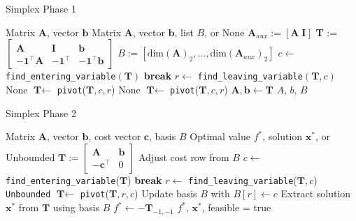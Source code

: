 \documentclass[conference]{IEEEtran}
\begin{document}
    \begin{algorithm}
    \caption{Simplex Phase 1}
    \label{alg:phase1}
    \begin{algorithmic}[1]
    \Require Matrix $\textbf{A}$, vector $\textbf{b}$
    \Ensure  Matrix $\textbf{A}$, vector $\textbf{b}$, list $B$, or None
    \State $\textbf{A}_{aux} := [\textbf{A} \; \textbf{I}]$
    \State \textbf{T} := 
    $\begin{bmatrix}
    \textbf{A} & \textbf{I} & \textbf{b} \\
    -\mathbf{1}^\top \textbf{A} & -\mathbf{1}^\top & -\mathbf{1}^\top \textbf{b}
    \end{bmatrix}$
    \State $B := [\text{dim}(\textbf{A})_2,\dots,\text{dim}(\textbf{A}_{aux})_2]$
        \State $c \gets $ \texttt{find\_entering\_variable}$(\textbf{T})$
            \State \textbf{break}
        \EndIf
        \State  $r \gets $ \texttt{find\_leaving\_variable}$(\textbf{T},c)$
            \State \Return None 
        \EndIf
        \State $\textbf{T} \gets $ \texttt{pivot}($\textbf{T},c,r$)
    \EndWhile
     
        \State \Return None 
    \EndIf
    \State $\textbf{T} \gets $ \texttt{pivot}($\textbf{T},c,r$) 
    \State $\textbf{A}, \textbf{b} \gets \textbf{T}$
    \State \Return $A$, $b$, $B$
    \end{algorithmic}
    \end{algorithm}
    
    \begin{algorithm}
        \caption{Simplex Phase 2}
        \label{alg:phase2}
        \begin{algorithmic}[1]
        \Require Matrix $\textbf{A}$, vector $\textbf{b}$, cost vector $\textbf{c}$, basis $B$
        \Ensure Optimal value $f^*$, solution $\textbf{x}^*$, or Unbounded
        \State $\textbf{T} := \begin{bmatrix} \textbf{A} & \textbf{b} \\ -\textbf{c}^\top & 0 \end{bmatrix}$
        \State Adjust cost row from $B$ 
            \State $c \gets$ \texttt{find\_entering\_variable}($\textbf{T}$)
                \State \textbf{break} 
            \EndIf
            \State $r \gets$ \texttt{find\_leaving\_variable}($\textbf{T}, c$)
                \State \Return \texttt{Unbounded}
            \EndIf
            \State $\textbf{T} \gets$ \texttt{pivot}($\textbf{T}, r, c$)
            \State Update basis $B$ with $B[r] \gets c$
        \EndWhile
        \State Extract solution $\textbf{x}^*$ from $\textbf{T}$ using basis $B$
        \State $f^* \gets -\textbf{T}_{-1, -1}$ 
        \State \Return $f^*$, $\textbf{x}^*$, feasible = true
        \end{algorithmic}
    \end{algorithm}



\end{document}
